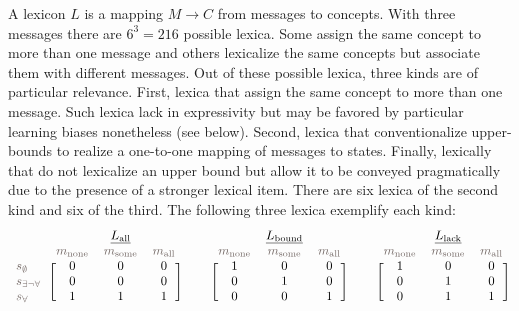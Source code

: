 \documentclass[a4paper, 11pt]{article}
\theoremstyle{Satz}
\newcommand{\state}{\ensuremath{s}\xspace}		%
\newcommand{\mystate}[1]{\ensuremath{\state_{\text{#1}}}\xspace} %
\newcommand{\mylang}[1]{\ensuremath{L_{\text{#1}}}\xspace} %
\newcommand{\Messgs}{\ensuremath{M}\xspace}		%
\newcommand{\messg}{\ensuremath{m}\xspace}		%
\newcommand{\mymessg}[1]{\ensuremath{\messg_{\text{#1}}}\xspace} %
\newcommand{\ssome}{\mystate{\ensuremath{\exists\neg\forall}}}
\newcommand{\sall}{\mystate{\ensuremath{\forall}}}
\newcommand{\snone}{\mystate{\ensuremath{\emptyset}}}
\newcommand{\msome}{\mymessg{some}}
\newcommand{\mall}{\mymessg{all}}
\newcommand{\mnone}{\mymessg{none}}
\newcommand{\Lall}{\mylang{all}}
\newcommand{\Lbound}{\mylang{bound}}
\newcommand{\Llack}{\mylang{lack}}
\newcommand{\mygray}[1]{{\textcolor{mygray}{#1}}}
\begin{document}
A lexicon $L$ is a mapping $\Messgs \rightarrow C$ from messages to concepts. With three
messages there are $6^3 = 216$ possible lexica. Some assign the same concept to more than one
message and others lexicalize the same concepts but associate them with different messages. Out
of these possible lexica, three kinds are of particular relevance. First, lexica that assign
the same concept to more than one message. Such lexica lack in expressivity but may be favored
by particular learning biases nonetheless (see below). Second, lexica that conventionalize
upper-bounds to realize a one-to-one mapping of messages to states. Finally, lexically that do
not lexicalize an upper bound but allow it to be conveyed pragmatically due to the presence of
a stronger lexical item. There are six lexica of the second kind and six of the third. The
following three lexica exemplify each kind:
\begin{align*}
  \begin{blockarray}{lccc}
    & & \underline{\Lall} & \\
    & \mygray{\mnone} & \mygray{\msome} & \mygray{\mall} \\
    \begin{block}{l[ccc]}
     \mygray{\snone}  & 0 & 0 & 0\\
     \mygray{\ssome}  & 0 & 0 & 0\\
    \mygray{\sall}   & 1 & 1 & 1\\
    \end{block}
  \end{blockarray} & &
 \begin{blockarray}{lccc}
    & & \underline{\Lbound} & \\
    & \mygray{\mnone} & \mygray{\msome} & \mygray{\mall} \\
    \begin{block}{l[ccc]}
       & 1 & 0 & 0\\
       & 0 & 1 & 0\\
       & 0 & 0 & 1\\
    \end{block}
  \end{blockarray} & &
  \begin{blockarray}{lccc}
    & & \underline{\Llack} & \\
    & \mygray{\mnone} & \mygray{\msome} & \mygray{\mall} \\
    \begin{block}{l[ccc]}
       & 1 & 0 & 0\\
       & 0 & 1 & 0\\
       & 0 & 1 & 1\\
    \end{block}
  \end{blockarray}
\end{align*}
\end{document}
